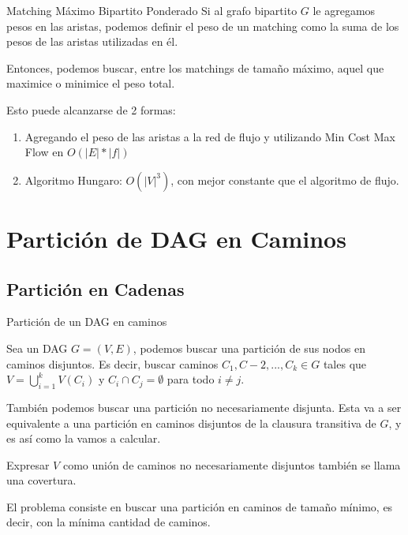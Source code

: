 \documentclass{beamer}
\begin{document}
\begin{frame}{Matching Máximo Bipartito Ponderado}
    Si al grafo bipartito $G$ le agregamos pesos en las aristas, podemos definir el peso de un matching como la suma de los pesos de las aristas utilizadas en él.

    Entonces, podemos buscar, entre los matchings de tamaño máximo, aquel que maximice o minimice el peso total.

    Esto puede alcanzarse de 2 formas:

    \begin{enumerate}
        \item Agregando el peso de las aristas a la red de flujo y utilizando Min Cost Max Flow en $O(|E|*|f|)$
        \item Algoritmo Hungaro: $O(|V|^3)$, con mejor constante que el algoritmo de flujo.
    \end{enumerate}
\end{frame}

\section{Partición de DAG en Caminos}
    \subsection{Partición en Cadenas}
    \begin{frame}{Partición de un DAG en caminos}
        
        \begin{definition}
           Sea un DAG $G = (V,E)$, podemos buscar una partición de sus nodos en caminos disjuntos. Es decir, buscar caminos $C_1, C-2, ..., C_k \in G$ tales que $V = \bigcup_{i=1}^k V(C_i)$ y $C_i \cap C_j = \emptyset$ para todo $i \neq j$.
        \end{definition}
        
        También podemos buscar una partición no necesariamente disjunta. Esta va a ser equivalente a una partición en caminos disjuntos de la clausura transitiva de $G$, y es así como la vamos a calcular.

        Expresar $V$ como unión de caminos no necesariamente disjuntos también se llama una covertura. 

        El problema consiste en buscar una partición en caminos de tamaño mínimo, es decir, con la mínima cantidad de caminos.
    \end{frame}
\end{document}
